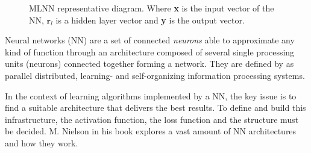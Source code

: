 \documentclass[conference]{IEEEtran}
\begin{document}
\begin{figure}[!hbp]
\centering


\caption{MLNN representative diagram. Where \textbf{x} is the input vector of the NN, $\textbf{r}_{l}$ is a hidden layer vector
and \textbf{y} is the output vector.} \label{fig:NN}
\end{figure}

Neural networks (NN) are a set of connected \textit{neurons} able to approximate any kind of function through an architecture composed of several single processing units (neurons) connected together forming a network. They are defined by \cite{b9} as parallel distributed, learning- and self-organizing information processing systems. 

In the context of learning algorithms implemented by a NN, the key issue is to find a suitable architecture that delivers the best results. To define and build this infrastructure, the activation function, the loss function and the structure must be decided.  M. Nielson \cite{b8} in his book explores a vast amount of NN architectures and how they work. 
\end{document}
